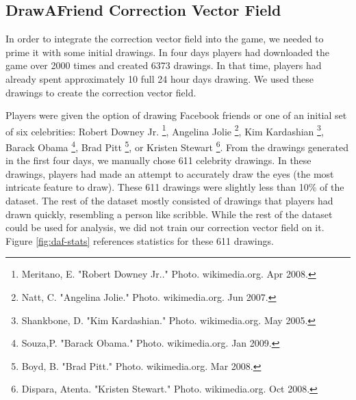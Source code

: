 \subsection{DrawAFriend Correction Vector Field}
In order to integrate the correction vector field into the game, we needed to prime it with some initial drawings. In four days players had downloaded the game over 2000 times and created 6373 drawings. In that time, players had already spent approximately 10 full 24 hour days drawing. We used these drawings to create the correction vector field.


Players were given the option of drawing Facebook friends or one of an initial set of six celebrities: Robert Downey Jr. \footnote{Meritano, E. "Robert Downey Jr.." Photo. wikimedia.org. Apr 2008.}, Angelina Jolie \footnote{Natt, C. "Angelina Jolie." Photo. wikimedia.org. Jun 2007.}, Kim Kardashian \footnote{Shankbone, D. "Kim Kardashian." Photo. wikimedia.org. May 2005.}, Barack Obama \footnote{Souza,P. "Barack Obama." Photo. wikimedia.org. Jan 2009.}, Brad Pitt \footnote{Boyd, B. "Brad Pitt." Photo. wikimedia.org. Mar 2008.}, or Kristen Stewart \footnote{Dispara, Atenta. "Kristen Stewart." Photo. wikimedia.org. Oct 2008.}. From the drawings generated in the first four days, we manually chose 611 celebrity drawings. In these drawings, players had made an attempt to accurately draw the eyes (the most intricate feature to draw). These 611 drawings were slightly less than 10\% of the dataset. The rest of the dataset mostly consisted of drawings that players had drawn quickly, resembling a person like scribble. While the rest of the dataset could be used for analysis, we did not train our correction vector field on it.  Figure \ref{fig:daf-stats} references statistics for these 611 drawings.


